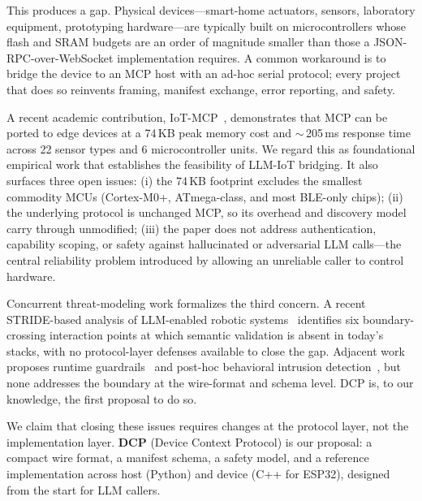 \documentclass[11pt,a4paper]{article}
\begin{document}
This produces a gap. Physical devices---smart-home actuators, sensors,
laboratory equipment, prototyping hardware---are typically built on
microcontrollers whose flash and SRAM budgets are an order of magnitude
smaller than those a JSON-RPC-over-WebSocket implementation requires. A
common workaround is to bridge the device to an MCP host with an ad-hoc
serial protocol; every project that does so reinvents framing, manifest
exchange, error reporting, and safety.

A recent academic contribution, IoT-MCP~\cite{iotmcp2025}, demonstrates that
MCP can be ported to edge devices at a 74\,KB peak memory cost and
$\sim$\,205\,ms response time across 22 sensor types and 6 microcontroller
units. We regard this as foundational empirical work that establishes the
feasibility of LLM-IoT bridging. It also surfaces three open issues: (i) the
74\,KB footprint excludes the smallest commodity MCUs (Cortex-M0+, ATmega-class,
and most BLE-only chips); (ii) the underlying protocol is unchanged MCP, so
its overhead and discovery model carry through unmodified; (iii) the paper
does not address authentication, capability scoping, or safety against
hallucinated or adversarial LLM calls---the central reliability problem
introduced by allowing an unreliable caller to control hardware.

Concurrent threat-modeling work formalizes the third concern. A recent
STRIDE-based analysis of LLM-enabled robotic systems~\cite{prompt_to_actuation}
identifies six boundary-crossing interaction points at which semantic
validation is absent in today's stacks, with no protocol-layer defenses
available to close the gap. Adjacent work proposes runtime
guardrails~\cite{web_of_drones,robosafe} and post-hoc behavioral intrusion
detection~\cite{aegismcp}, but none addresses the boundary at the
wire-format and schema level. DCP is, to our knowledge, the first proposal
to do so.

We claim that closing these issues requires changes at the protocol layer,
not the implementation layer. \textbf{DCP} (Device Context Protocol) is
our proposal: a compact wire format, a manifest schema, a safety model, and
a reference implementation across host (Python) and device (C++ for ESP32),
designed from the start for LLM callers.
\end{document}

